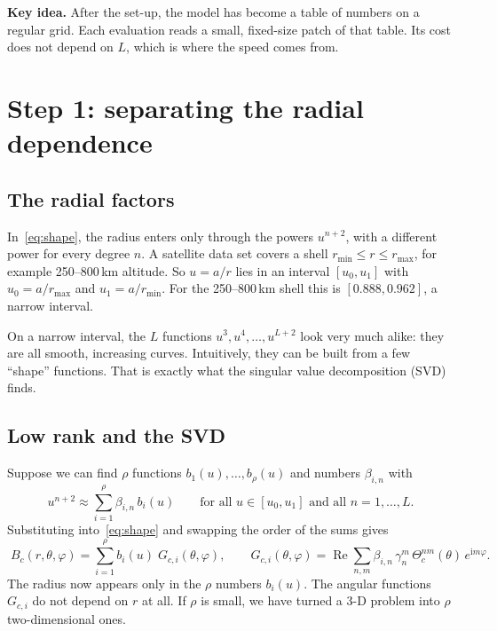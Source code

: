 \documentclass[11pt,a4paper]{article}
\theoremstyle{definition}
\renewcommand{\Re}{\operatorname{Re}}
\newcommand{\ii}{\mathrm{i}}
\newcommand{\keyidea}[1]{\par\smallskip\noindent\colorbox{boxbg}{\parbox{\dimexpr\linewidth-2\fboxsep}{\small #1}}\par\smallskip}
\begin{document}
\keyidea{\textbf{Key idea.} After the set-up, the model has become a table of numbers on a regular grid. Each evaluation
reads a small, fixed-size patch of that table. Its cost does not depend on $L$, which is where the speed comes from.}

\section{Step 1: separating the radial dependence}\label{sec:step1}

\subsection{The radial factors}
In~\eqref{eq:shape}, the radius enters only through the powers $u^{n+2}$, with a different power for every degree $n$. A satellite data
set covers a shell $r_{\min}\le r\le r_{\max}$, for example 250--800\,km altitude. So $u=a/r$ lies in an interval
$[u_0,u_1]$ with $u_0=a/r_{\max}$ and $u_1=a/r_{\min}$. For the 250--800\,km shell this is $[0.888,0.962]$, a narrow interval.

On a narrow interval, the $L$ functions $u^3,u^4,\dots,u^{L+2}$ look very much alike: they are all smooth, increasing
curves. Intuitively, they can be built from a few ``shape'' functions. That is exactly what the singular value decomposition (SVD) finds.

\subsection{Low rank and the SVD}
Suppose we can find $\rho$ functions $b_1(u),\dots,b_\rho(u)$ and numbers $\beta_{i,n}$ with
\begin{equation}\label{eq:radsplit}
u^{n+2}\approx\sum_{i=1}^{\rho}\beta_{i,n}\,b_i(u)\qquad\text{for all }u\in[u_0,u_1]\text{ and all }n=1,\dots,L.
\end{equation}
Substituting into~\eqref{eq:shape} and swapping the order of the sums gives
\begin{equation}\label{eq:BG}
\boxed{\;B_c(r,\theta,\varphi)=\sum_{i=1}^{\rho}b_i(u)\;G_{c,i}(\theta,\varphi),\qquad
G_{c,i}(\theta,\varphi)=\Re\sum_{n,m}\beta_{i,n}\,\gamma_n^m\,\Theta_c^{nm}(\theta)\,e^{\ii m\varphi}.\;}
\end{equation}
The radius now appears only in the $\rho$ numbers $b_i(u)$. The angular functions $G_{c,i}$ do not depend on $r$ at all. If $\rho$ is small,
we have turned a 3-D problem into $\rho$ two-dimensional ones.
\end{document}

